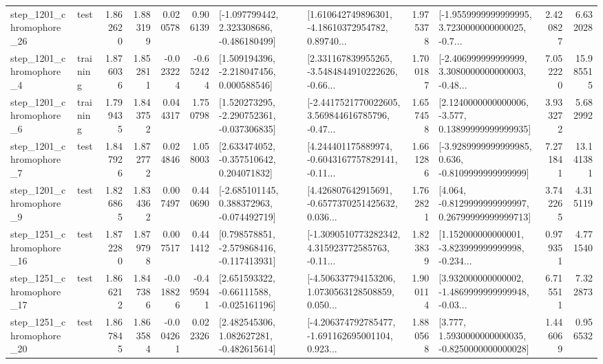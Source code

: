 \begin{tabular}{llrrrrllrlrr}
 step\_1201\_chromophore\_26 &      test &      1.862620 &    1.883199 &      0.020578 &  0.906139 &   [-1.097799442, 2.323308686, -0.486180499] &  [1.610642749896301, -4.18610372954782, 0.89740... &       1.975378 &  [-1.9559999999999995, 3.7230000000000025, -0.7... &            2.420827 &          6.632028 \\
  step\_1201\_chromophore\_4 &  training &      1.876036 &    1.852811 &     -0.023224 & -0.652424 &    [1.509194396, -2.218047456, 0.000588546] &  [2.331167839955265, -3.5484844910222626, -0.66... &       1.700187 &  [-2.406999999999999, 3.3080000000000003, -0.48... &            7.052220 &         15.985515 \\
  step\_1201\_chromophore\_6 &  training &      1.799435 &    1.843752 &      0.044317 &  1.750798 &   [1.520273295, -2.290752361, -0.037306835] &  [-2.4417521770022605, 3.569844616785796, -0.47... &       1.657458 &  [2.1240000000000006, -3.577, 0.13899999999999935] &            3.933272 &          5.682992 \\
  step\_1201\_chromophore\_7 &      test &      1.847926 &    1.872772 &      0.024846 &  1.058003 &    [2.633474052, -0.357510642, 0.204071832] &  [4.244401175889974, -0.6043167757829141, -0.11... &       1.661286 &  [-3.9289999999999985, 0.636, -0.8109999999999999] &            7.271841 &         13.141381 \\
  step\_1201\_chromophore\_9 &      test &      1.826865 &    1.834362 &      0.007497 &  0.440690 &   [-2.685101145, 0.388372963, -0.074492719] &  [4.426807642915691, -0.6577370251425632, 0.036... &       1.762821 &  [4.064, -0.8129999999999997, 0.26799999999999713] &            3.742265 &          4.315119 \\
 step\_1251\_chromophore\_16 &      test &      1.872280 &    1.879798 &      0.007517 &  0.441412 &   [0.798578851, -2.579868416, -0.117413931] &  [-1.3090510773282342, 4.315923772585763, -0.11... &       1.823839 &  [1.152000000000001, -3.823999999999998, -0.234... &            0.979351 &          4.771540 \\
 step\_1251\_chromophore\_17 &      test &      1.866212 &    1.847386 &     -0.018826 & -0.495941 &    [2.651593322, -0.66111588, -0.025161196] &  [-4.506337794153206, 1.0730563128508859, 0.050... &       1.900114 &  [3.932000000000002, -1.4869999999999948, -0.03... &            6.715511 &          7.322873 \\
 step\_1251\_chromophore\_20 &      test &      1.867845 &    1.863584 &     -0.004261 &  0.022326 &    [2.482545306, 1.082627281, -0.482615614] &  [-4.206374792785477, -1.691162695001104, 0.923... &       1.880568 &   [3.777, 1.5930000000000035, -0.8250000000000028] &            1.446069 &          0.956532 \\

\end{tabular}
